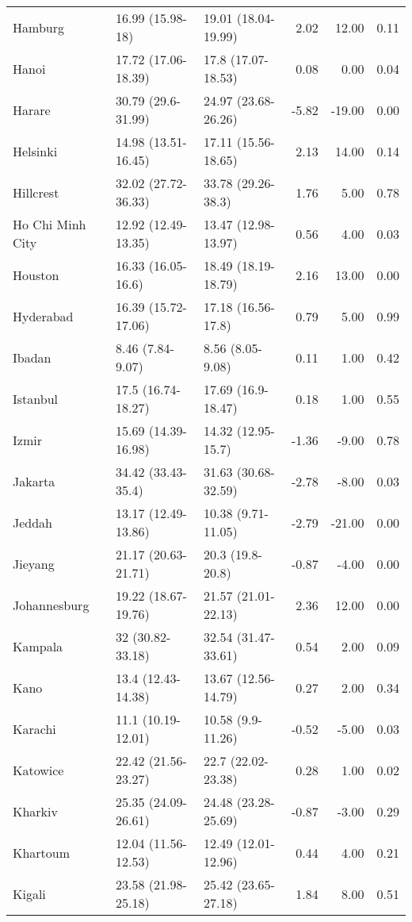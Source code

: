 \begin{longtable}{lllrrr}
  Hamburg & 16.99
 (15.98-18) & 19.01
 (18.04-19.99) & 2.02 & 12.00 & 0.11 \\ 
  Hanoi & 17.72
 (17.06-18.39) & 17.8
 (17.07-18.53) & 0.08 & 0.00 & 0.04 \\ 
  Harare & 30.79
 (29.6-31.99) & 24.97
 (23.68-26.26) & -5.82 & -19.00 & 0.00 \\ 
  Helsinki & 14.98
 (13.51-16.45) & 17.11
 (15.56-18.65) & 2.13 & 14.00 & 0.14 \\ 
  Hillcrest & 32.02
 (27.72-36.33) & 33.78
 (29.26-38.3) & 1.76 & 5.00 & 0.78 \\ 
  Ho Chi Minh City & 12.92
 (12.49-13.35) & 13.47
 (12.98-13.97) & 0.56 & 4.00 & 0.03 \\ 
  Houston & 16.33
 (16.05-16.6) & 18.49
 (18.19-18.79) & 2.16 & 13.00 & 0.00 \\ 
  Hyderabad & 16.39
 (15.72-17.06) & 17.18
 (16.56-17.8) & 0.79 & 5.00 & 0.99 \\ 
  Ibadan & 8.46
 (7.84-9.07) & 8.56
 (8.05-9.08) & 0.11 & 1.00 & 0.42 \\ 
  Istanbul & 17.5
 (16.74-18.27) & 17.69
 (16.9-18.47) & 0.18 & 1.00 & 0.55 \\ 
  Izmir & 15.69
 (14.39-16.98) & 14.32
 (12.95-15.7) & -1.36 & -9.00 & 0.78 \\ 
  Jakarta & 34.42
 (33.43-35.4) & 31.63
 (30.68-32.59) & -2.78 & -8.00 & 0.03 \\ 
  Jeddah & 13.17
 (12.49-13.86) & 10.38
 (9.71-11.05) & -2.79 & -21.00 & 0.00 \\ 
  Jieyang & 21.17
 (20.63-21.71) & 20.3
 (19.8-20.8) & -0.87 & -4.00 & 0.00 \\ 
  Johannesburg & 19.22
 (18.67-19.76) & 21.57
 (21.01-22.13) & 2.36 & 12.00 & 0.00 \\ 
  Kampala & 32
 (30.82-33.18) & 32.54
 (31.47-33.61) & 0.54 & 2.00 & 0.09 \\ 
  Kano & 13.4
 (12.43-14.38) & 13.67
 (12.56-14.79) & 0.27 & 2.00 & 0.34 \\ 
  Karachi & 11.1
 (10.19-12.01) & 10.58
 (9.9-11.26) & -0.52 & -5.00 & 0.03 \\ 
  Katowice & 22.42
 (21.56-23.27) & 22.7
 (22.02-23.38) & 0.28 & 1.00 & 0.02 \\ 
  Kharkiv & 25.35
 (24.09-26.61) & 24.48
 (23.28-25.69) & -0.87 & -3.00 & 0.29 \\ 
  Khartoum & 12.04
 (11.56-12.53) & 12.49
 (12.01-12.96) & 0.44 & 4.00 & 0.21 \\ 
  Kigali & 23.58
 (21.98-25.18) & 25.42
 (23.65-27.18) & 1.84 & 8.00 & 0.51 \\ 

\end{longtable}
